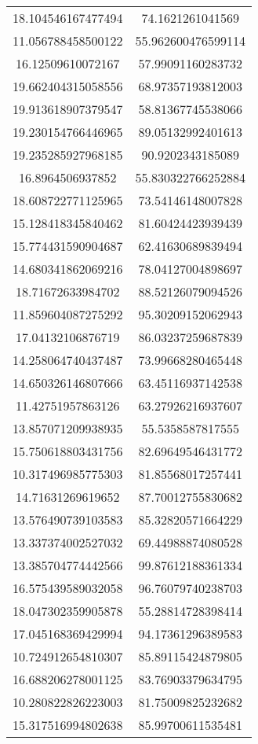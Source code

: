 \begin{table}
\begin{tabular}{cc}
18.104546167477494 & 74.1621261041569 \\
11.056788458500122 & 55.962600476599114 \\
16.12509610072167 & 57.99091160283732 \\
19.662404315058556 & 68.97357193812003 \\
19.913618907379547 & 58.81367745538066 \\
19.230154766446965 & 89.05132992401613 \\
19.235285927968185 & 90.9202343185089 \\
16.8964506937852 & 55.830322766252884 \\
18.608722771125965 & 73.54146148007828 \\
15.128418345840462 & 81.60424423939439 \\
15.774431590904687 & 62.41630689839494 \\
14.680341862069216 & 78.04127004898697 \\
18.71672633984702 & 88.52126079094526 \\
11.859604087275292 & 95.30209152062943 \\
17.04132106876719 & 86.03237259687839 \\
14.258064740437487 & 73.99668280465448 \\
14.650326146807666 & 63.45116937142538 \\
11.42751957863126 & 63.27926216937607 \\
13.857071209938935 & 55.5358587817555 \\
15.750618803431756 & 82.69649546431772 \\
10.317496985775303 & 81.85568017257441 \\
14.71631269619652 & 87.70012755830682 \\
13.576490739103583 & 85.32820571664229 \\
13.337374002527032 & 69.44988874080528 \\
13.385704774442566 & 99.87612188361334 \\
16.575439589032058 & 96.76079740238703 \\
18.047302359905878 & 55.28814728398414 \\
17.045168369429994 & 94.17361296389583 \\
10.724912654810307 & 85.89115424879805 \\
16.688206278001125 & 83.76903379634795 \\
10.280822826223003 & 81.75009825232682 \\
15.317516994802638 & 85.99700611535481 \\

\end{tabular}
\end{table}
